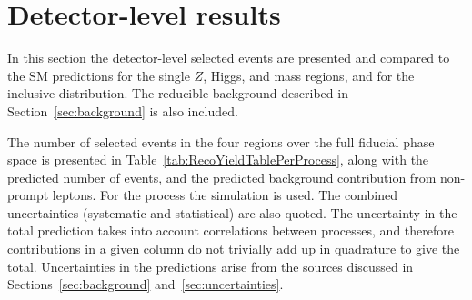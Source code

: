 \section{Detector-level results}
\label{sec:m4lrecoresults}
In this section the detector-level selected events are presented and compared to the SM predictions for the single $Z$, Higgs, \onshellZZ and \offshellZZ mass regions, and for the inclusive \mFourL{} distribution. The reducible background described in Section~\ref{sec:background} is also included. 

The number of selected events in the four \mFourL{} regions over the full fiducial phase space is presented in Table~\ref{tab:RecoYieldTablePerProcess}, along with the predicted number of events, and the predicted background contribution from non-prompt leptons. For the \qqFourL{} process the \SHERPA{} simulation is used. The combined uncertainties (systematic and statistical) are also quoted. The uncertainty in the total prediction takes into account correlations between processes, and therefore contributions in a given column do not trivially add up in quadrature to give the total. Uncertainties in the predictions arise from the sources discussed in Sections~\ref{sec:background} and~\ref{sec:uncertainties}. 


